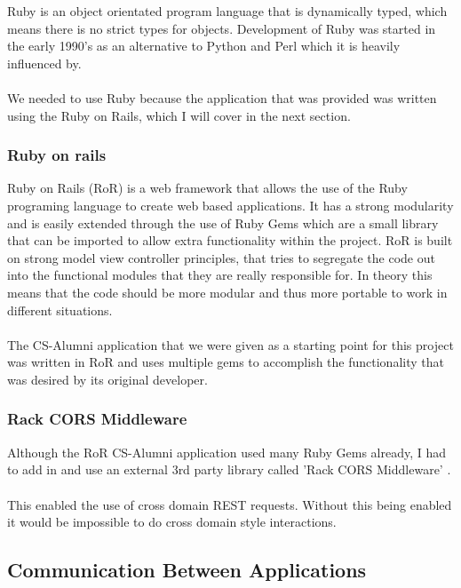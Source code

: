 \documentclass{article}
\begin{document}
Ruby is an object orientated program language that is dynamically typed, which means there is no strict types for objects. Development of Ruby was started in the early 1990's as an alternative to Python and Perl which it is heavily influenced by.\\
\\
We needed to use Ruby because the application that was provided was written using the Ruby on Rails, which I will cover in the next section.

\subsubsection{Ruby on rails}

Ruby on Rails (RoR) is a web framework that allows the use of the Ruby programing language to create web based applications. It has a strong modularity and is easily extended through the use of Ruby Gems which are a small library that can be imported to allow extra functionality within the project. RoR is built on strong model view controller principles, that tries to segregate the code out into the functional modules that they are really responsible for. In theory this means that the code should be more modular and thus more portable to work in different situations.\\
\\
The CS-Alumni application that we were given as a starting point for this project was written in RoR and uses multiple gems to accomplish the functionality that was desired by its original developer.

\subsubsection{Rack CORS Middleware}

Although the RoR CS-Alumni application used many Ruby Gems already, I had to add in and use an external 3rd party library called 'Rack CORS Middleware' \cite[see reference][page \pageref{LastPage}]{cors:2014:online}.\\
\\
This enabled the use of cross domain REST requests. Without this being enabled it would be impossible to do cross domain style interactions.

\subsection{Communication Between Applications}
\end{document}

